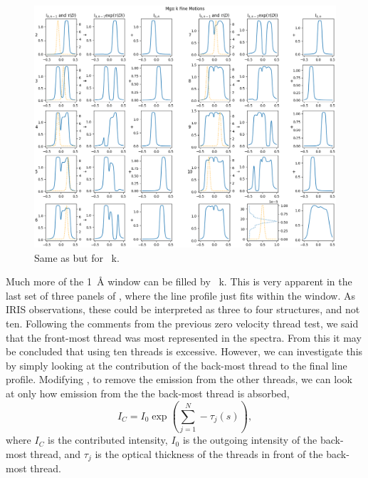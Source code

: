 \begin{figure}
    \includegraphics[width=\linewidth]{./03Modelling2D/figs/StanoPlots/fast/k.png}
    \caption[Fast Moving \mgii~k threads.]{Same as  but for \mgii~k.}
    \label{fastmgiik}
\end{figure}
Much more of the 1~\AA{} window can be filled by \mgii~k. This is very apparent in the last set of three panels of , where the line profile just fits within the window. As IRIS observations, these could be interpreted as three to four structures, and not ten. Following the comments from the previous zero velocity thread test, we said that the front-most thread was most represented in the spectra. From this it may be concluded that using ten threads is excessive. However, we can investigate this by simply looking at the contribution of the back-most thread to the final line profile. Modifying , to remove the emission from the other threads, we can look at only how emission from the the back-most thread is absorbed,
\begin{equation}
    I_C=I_0\exp\left(\sum_{j=1}^N-\tau_j(s)\right),
\end{equation}
where $I_C$ is the contributed intensity, $I_0$ is the outgoing intensity of the back-most thread, and $\tau_j$ is the optical thickness of the threads in front of the back-most thread.
